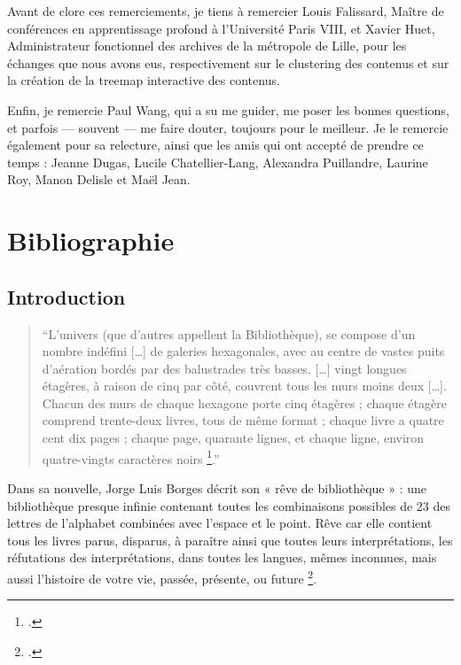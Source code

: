 \documentclass[a4paper,12pt,twoside]{book}
\begin{document}
	Avant de clore ces remerciements, je tiens à remercier Louis Falissard, Maître de conférences en apprentissage profond à l’Université Paris VIII, et Xavier Huet, Administrateur fonctionnel des archives de la métropole de Lille, pour les échanges que nous avons eus, respectivement sur le clustering des contenus et sur la création de la treemap interactive des contenus.
	
	Enfin, je remercie Paul Wang, qui a su me guider, me poser les bonnes questions, et parfois — souvent — me faire douter, toujours pour le meilleur. Je le remercie également pour sa relecture, ainsi que les amis qui ont accepté de prendre ce temps : Jeanne Dugas, Lucile Chatellier-Lang, Alexandra Puillandre, Laurine Roy, Manon Delisle et Maël Jean.
	
	\newpage{\pagestyle{empty}\cleardoublepage}
	
	\part*{Bibliographie}
	\printbibliography[keyword=partie1, title={Historique et enjeux}]
	\printbibliography[keyword=partie2, title={Nouvelles interfaces}]
	\printbibliography[keyword=partie3, title={Limites de la notion}]
	
	
	\printbibliography[keyword=dictionnaires, title={Encyclopédies et statistiques}]
	
	
	\chapter{Introduction}	
	 \begin{quote}
	 	\enquote{L’univers (que d’autres appellent la Bibliothèque), se compose d’un nombre indéfini […] de galeries hexagonales, avec au centre de vastes puits d’aération bordés par des balustrades très basses. […] vingt longues étagères, à raison de cinq par côté, couvrent tous les murs moins deux […]. Chacun des murs de chaque hexagone porte cinq étagères ; chaque étagère comprend trente-deux livres, tous de même format ; chaque livre a quatre cent dix pages ; chaque page, quarante lignes, et chaque ligne, environ quatre-vingts caractères noirs \footcite[p. 1]{borges1963}.}
	 \end{quote} 
	
	Dans sa nouvelle, Jorge Luis Borges décrit son « rêve de bibliothèque » : une bibliothèque presque infinie contenant toutes les combinaisons possibles de 23 des lettres de l’alphabet combinées avec l’espace et le point. Rêve car elle contient tous les livres parus, disparus, à paraître ainsi que toutes leurs interprétations, les réfutations des interprétations, dans toutes les langues, mêmes inconnues, mais aussi l’histoire de votre vie, passée, présente, ou future \footcite{marx}.
	
\end{document}
